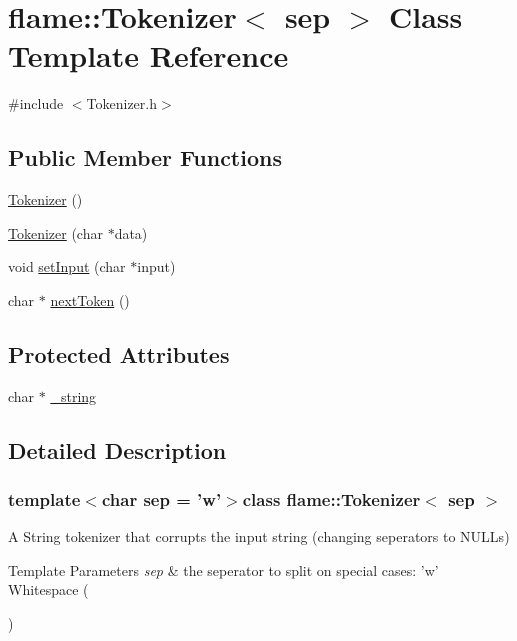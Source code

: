 \hypertarget{classflame_1_1_tokenizer}{\section{flame\-:\-:Tokenizer$<$ sep $>$ Class Template Reference}
\label{classflame_1_1_tokenizer}
}


{\ttfamily \#include $<$Tokenizer.\-h$>$}

\subsection*{Public Member Functions}
\begin{DoxyCompactItemize}
\item 
\hyperlink{classflame_1_1_tokenizer_a1d926b6a94cc50bbad244a8fbf8a355c}{Tokenizer} ()
\item 
\hyperlink{classflame_1_1_tokenizer_a16ff1751b2e7b2e963ca4caad6cbea4f}{Tokenizer} (char $\ast$data)
\item 
void \hyperlink{classflame_1_1_tokenizer_a74694cf1c3f0bbed932ac97eb4c4a108}{set\-Input} (char $\ast$input)
\item 
char $\ast$ \hyperlink{classflame_1_1_tokenizer_a2e3f5b263b0f041b66c5aae165153edd}{next\-Token} ()
\end{DoxyCompactItemize}
\subsection*{Protected Attributes}
\begin{DoxyCompactItemize}
\item 
char $\ast$ \hyperlink{classflame_1_1_tokenizer_aec4188ffcf47e418b5d6257706aa7067}{\-\_\-string}
\end{DoxyCompactItemize}


\subsection{Detailed Description}
\subsubsection*{template$<$char sep = 'w'$>$class flame\-::\-Tokenizer$<$ sep $>$}

A String tokenizer that corrupts the input string (changing seperators to N\-U\-L\-Ls) 
\begin{DoxyTemplParams}{Template Parameters}
{\em sep} & the seperator to split on special cases\-: 'w' Whitespace ( \par
) \\
\hline
\end{DoxyTemplParams}


